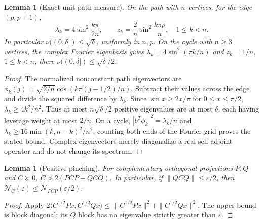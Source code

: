 \documentclass[11pt]{article}
\newtheorem{lemma}[theorem]{Lemma}
\newcommand{\N}{\mathcal N}
\begin{document}
\begin{lemma}[Exact unit-path measure]\label{lem:pathmeasure}
On the path with $n$ vertices, for the edge $(p,p+1)$,
\[
 \lambda_k=4\sin^2\frac{k\pi}{2n},\qquad
 z_k=\frac2n\sin^2\frac{k\pi p}{n},\quad 1\le k<n.
\]
In particular $\nu((0,\delta])\le\sqrt\delta$, uniformly in $n,p$.
On the cycle with $n\ge3$ vertices, the complex Fourier eigenbasis gives
$\lambda_k=4\sin^2(\pi k/n)$ and $z_k=1/n$, $1\le k<n$;
there $\nu((0,\delta])\le\sqrt\delta/2$.
\end{lemma}
\begin{proof}
The normalized nonconstant path eigenvectors are
$\phi_k(j)=\sqrt{2/n}\cos(k\pi(j-1/2)/n)$.
Subtract their values across the edge and divide the squared difference
by $\lambda_k$. Since $\sin x\ge2x/\pi$ for $0\le x\le\pi/2$,
$\lambda_k\ge4k^2/n^2$. Thus at most $n\sqrt\delta/2$
positive eigenvalues are at most $\delta$, each having leverage weight
at most $2/n$. On a cycle,
$|b^T\phi_k|^2=\lambda_k/n$ and
$\lambda_k\ge16\min(k,n-k)^2/n^2$; counting both ends of the
Fourier grid proves the stated bound. Complex eigenvectors merely
diagonalize a real self-adjoint operator and do not change its spectrum.
\end{proof}

\begin{lemma}[Positive pinching]\label{lem:pinch}
For complementary orthogonal projections $P,Q$ and $C\succeq0$,
$C\preceq2(PCP+QCQ)$. In particular, if
$\|QCQ\|\le\varepsilon/2$, then
$\N_C(\varepsilon)\le\N_{PCP}(\varepsilon/2)$.
\end{lemma}
\begin{proof}
Apply $2\langle C^{1/2}Px,C^{1/2}Qx\rangle
\le\|C^{1/2}Px\|^2+\|C^{1/2}Qx\|^2$.
The upper bound is block diagonal; its $Q$ block has no eigenvalue
strictly greater than $\varepsilon$.
\end{proof}
\end{document}
